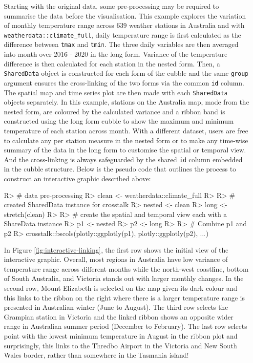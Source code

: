 \documentclass[
]{jss}
\begin{document}
Starting with the original data, some pre-processing may be required to
summarise the data before the visualisation. This example explores the
variation of monthly temperature range across 639 weather stations in
Australia and with \texttt{weatherdata::climate\_full}, daily
temperature range is first calculated as the difference between
\texttt{tmax} and \texttt{tmin}. The three daily variables are then
averaged into month over 2016 - 2020 in the long form. Variance of the
temperature difference is then calculated for each station in the nested
form. Then, a \texttt{SharedData} object is constructed for each form of
the cubble and the same \texttt{group} argument ensures the
cross-linking of the two forms via the common \texttt{id} column. The
spatial map and time series plot are then made with each
\texttt{SharedData} objects separately. In this example, stations on the
Australia map, made from the nested form, are coloured by the calculated
variance and a ribbon band is constructed using the long form cubble to
show the maximum and minimum temperature of each station across month.
With a different dataset, users are free to calculate any per station
measure in the nested form or to make any time-wise summary of the data
in the long form to customise the spatial or temporal view. And the
cross-linking is always safeguarded by the shared \texttt{id} column
embedded in the cubble structure. Below is the pseudo code that outlines
the process to construct an interactive graphic described above:

\begin{CodeChunk}
\begin{CodeInput}
R> # data pre-processing
R> clean <- weatherdata::climate_full %
R> 
R> # created SharedData instance for crosstalk
R> nested <- clean %
R> long <- stretch(clean) %
R> 
R> # create the spatial and temporal view each with a ShareData instance
R> p1 <- nested %
R> p2 <- long %
R> 
R> # Combine p1 and p2
R> crosstalk::bscols(plotly::ggplotly(p1), plotly::ggplotly(p2), ...)
\end{CodeInput}
\end{CodeChunk}

In Figure \ref{fig:interactive-linking}, the first row shows the initial
view of the interactive graphic. Overall, most regions in Australia have
low variance of temperature range across different months while the
north-west coastline, bottom of South Australia, and Victoria stands out
with larger monthly changes. In the second row, Mount Elizabeth is
selected on the map given its dark colour and this links to the ribbon
on the right where there is a larger temperature range is presented in
Australian winter (June to August). The third row selects the Grampian
station in Victoria and the linked ribbon shows an opposite wider range
in Australian summer period (December to February). The last row selects
point with the lowest minimum temperature in August in the ribbon plot
and surprisingly, this links to the Thredbo Airport in the Victoria and
New South Wales border, rather than somewhere in the Tasmania island!
\end{document}
